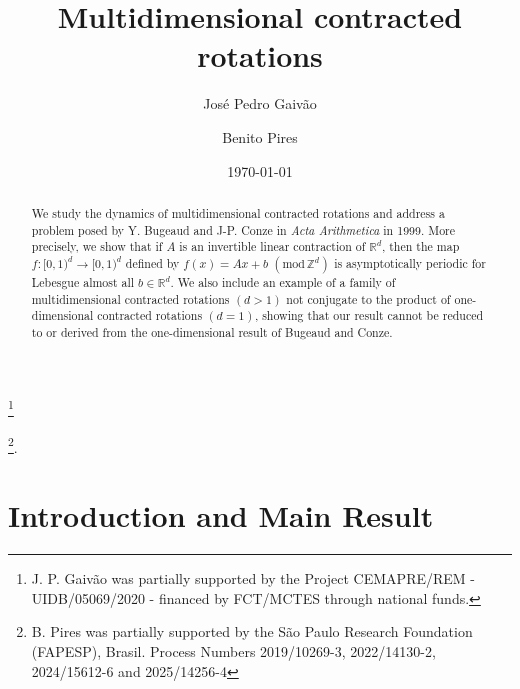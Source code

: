\documentclass[12pt,reqno,a4paper]{amsart}%
\theoremstyle{definition}
\theoremstyle{remark}
\begin{document}
\title[Multidimensional contracted rotations]
{Multidimensional contracted rotations}

\author[Gaiv\~ao]{Jos\'e Pedro Gaiv\~ao}
\thanks{J. P. Gaiv\~ao was partially supported by the Project CEMAPRE/REM - UIDB/05069/2020 - financed by FCT/MCTES through national funds.}
\address{ISEG/UL - Universidade de Lisboa, Department of Mathematics; REM - Research in Economics and Mathematics, CEMAPRE\\
Rua do Quelhas 6, 1200-781 Lisboa, Portugal}

\author[Pires]{Benito Pires}\thanks{
B. Pires was partially supported 
by the S\~ao Paulo Research Foundation (FAPESP), Brasil. Process Numbers 2019/10269-3,  2022/14130-2, 2024/15612-6 and 2025/14256-4}.
\address{Departamento de Computa\c c\~ao e Matem\'atica\\ Faculdade de Filosofia, Ci\^encias e Letras, Universidade de S\~ao Paulo\\ Ribeir\~ao Preto, SP, 14040-901, Brazil}

\date{\today}  

%
\begin{abstract}
We study the dynamics of multidimensional contracted rotations and address a problem posed by Y. Bugeaud and J-P. Conze in \textit{Acta Arithmetica} in 1999. More precisely, we show that if $A$ is an invertible linear contraction of $\mathbb{R}^d$, then the map $f: [0,1)^d\to [0,1)^d$ defined by  $f(x) = Ax +b\,\,(\textrm{mod}\,\mathbb{Z}^d)$ is asymptotically periodic for Lebesgue almost all $b\in\mathbb{R}^d$. We also include an example of a family of multidimensional contracted rotations $(d>1)$ not conjugate to the  product of one-dimensional contracted rotations $(d=1)$, showing that our result cannot be reduced to or derived from the one-dimensional result of Bugeaud and Conze.
\end{abstract}

\maketitle
\section{Introduction and Main Result}
\end{document}
